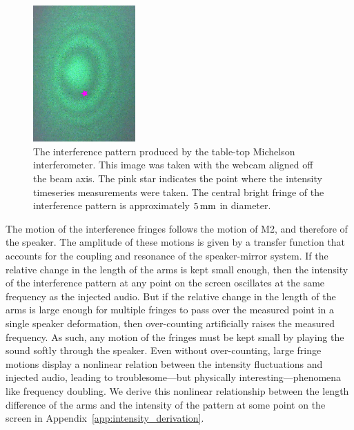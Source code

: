 \documentclass[paper-main.tex]{subfiles}
\begin{document}
\begin{figure}
 \begin{center}
  \includegraphics[width=0.35\textwidth, angle=-90]{figures/webcam_still0_star.pdf}
 \end{center}
 \caption{\label{fig:interference_pattern}
The interference pattern produced by the table-top Michelson interferometer.
This image was taken with the webcam aligned off the beam axis. %
The pink star indicates the point where the intensity timeseries measurements were taken.
The central bright fringe of the interference pattern is approximately $5\,{\rm mm}$ in diameter. 
}
\end{figure}

The motion of the interference fringes follows the motion of M2, and therefore of the speaker.
The amplitude of these motions is given by a transfer function that accounts for the coupling and resonance of the speaker-mirror system.
If the relative change in the length of the arms is kept small enough, then the intensity of the interference pattern at any point on the screen oscillates at the same frequency as the injected audio.
But if the relative change in the length of the arms is large enough for multiple fringes to pass over the measured point in a single speaker deformation, then over-counting artificially raises the measured frequency.
As such, any motion of the fringes must be kept small by playing the sound softly through the speaker.
Even without over-counting, large fringe motions display a nonlinear relation between the intensity fluctuations and injected audio, leading to troublesome---but physically interesting---phenomena like frequency doubling.
We derive this nonlinear relationship between the length difference of the arms and the intensity of the pattern at some point on the screen in Appendix~\ref{app:intensity_derivation}.


\end{document}
